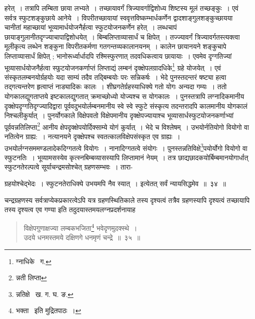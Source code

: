 \documentclass[11pt, openany]{book}
\begin{document}
\noindent हरेत्~। तत्रापि लम्बिता छाया लभ्यते~। तच्छायावर्गं त्रिज्यावर्गाद्विशोध्य शिष्टस्य मूलं तच्छङ्कुः~। एवं सर्वत्र
स्फुटशङ्कुछाये आनेये~। विपरीतच्छायायां स्ववृत्तविष्कम्भार्धकर्णेन द्वादशाङ्गुलशङ्कुच्छायया चानीतां महाच्छायां भूव्यामार्धयोजनैर्हत्वा स्फुटयोजनकर्णेन हरेत्~। लब्धचापं छायाङ्गुलानीतदृग्ज्याचापाद्विशोधयेत्~। बिम्बलिप्ताव्यासार्धं च क्षिपेत्~। तज्ज्यावर्गं त्रिज्यावर्गतस्त्यक्त्वा मूलीकृत्य लब्धेन शङ्कुना विपरीतकर्मणा गतगन्तव्यकालानयनम्~। कालेन छायानयने शङ्कुचापे लिप्ताव्यासार्धं क्षिपेत् ; भानोरूर्ध्वार्धादपि रश्मिस्फुरणात् तदवधिकत्वाय छायायाः~। एवमेव दृग्गतिज्यां भूव्यासार्धयोजनैर्हत्वा स्फुटयोजनकर्णाप्तं 
लिप्ताद्यं लम्बनं दृक्क्षेपलग्रादधिके\renewcommand{\thefootnote}{१}\footnote{ग्नाधिके \textendash\ ग.} ग्रहे  योजयेत्~। एवं
संस्कृतलम्बनयोर्ग्रहयोः यदा साम्यं तदैव तद्बिम्बयोः परः सन्निकर्षः~। भेदे पुनस्तदन्तरं षष्ट्या हत्वा तद्गत्यन्तरेण हृत्वाप्तं नाड्यादिकः कालः~। शीघ्रगतेर्ग्रहस्याधिक्ये गतो योगः अन्यदा गम्यः~। ततो योगकालद्युगताप्तये इष्टकालद्युगतात् क्रमाच्छोध्यो योज्यश्च स योगकालः~। पुनस्तत्रापि लग्नादिकमानीय दृक्क्षेपदृग्गतिदृग्ज्यादिद्वारा पूर्ववदुभयोर्लम्बनमानीय स्वे स्वे स्फुटे संस्कृत्य तदन्तरादपि कालमानीय योगकालं 
निश्चलीकुर्यात्~। पुनर्योगकाले विक्षेपवतो विक्षेपमानीय दृक्क्षेपज्यायाश्च भूव्यासार्धस्फुटयोजनकर्णाभ्यां पूर्ववन्नतिलिप्ता\renewcommand{\thefootnote}{२}\footnote{न्नती लिप्ता} आनीय क्षेपदृक्क्षेपयोर्दिक्साम्ये योगं कुर्यात्~। भेदे च विश्लेषम्~। उभयोर्नतियोगो वियोगो वा नतित्वेन ग्राह्य:~। नत्यानयने दृक्क्षेपश्च स्वतत्कालविक्षेपसंस्कृत एव 
ग्राह्यः~। उभयोर्लग्नसममण्डलादेकदिग्गतत्वे वियोगः~। नानादिग्गतत्वे संयोगः~। पुनस्तन्नतिविक्षे\renewcommand{\thefootnote}{३}\footnote{न्नतिक्षे \textendash\ ख. ग. घ. ङ.}पयोर्योगो वियोगो वा स्फुटनतिः~। भूव्यामसस्येव कृत्स्नबिम्बव्यासस्यापि लिप्तामानं नेयम्~। तत्र छाद्यछादकयोर्बिम्बमानयोगार्धात् स्फुटनतेरल्पत्वे सूर्याचन्द्रमसोश्चेत् ग्रहणसम्भवः~। तारा-

\newpage

\noindent ग्रहयोश्चेद्भेदः~। स्फुटनतेराधिक्ये उभयमपि नैव स्यात्~। इत्येतत् सर्वं न्यायसिद्धमेव~॥~३४~॥ \\
\begin{sloppypar} 
\indent चन्द्रग्रहणस्य सर्वत्राप्येकप्रकारत्वेऽपि यत्र ग्रहणस्थितिकाले तस्य दृश्यत्वं तत्रैव ग्रहणस्यापि दृश्यत्वं तच्छायापि 
तस्य दृश्यत्व एव गण्या इति तदुदयास्तमयलग्नप्रदर्शनायाह\textendash 
\end{sloppypar} 
\begin{quote}
{\ab विक्षेपगुणाक्षज्या लम्बकभजिता\renewcommand{\thefootnote}{१}\footnote{भक्ता \textendash\ इति मुद्रितपाठः~।} भवेदृणमुदक्स्थे~। \\
उदये धनमस्तमये दक्षिणगे धनमृणं चन्द्रे~॥~३५~॥} 
\end{quote}
\end{document}

